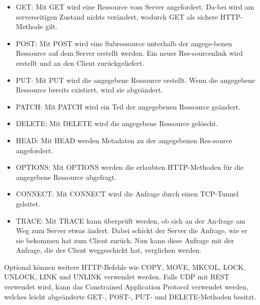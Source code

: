 \begin{itemize}
    \item GET: Mit GET wird eine Ressource vom Server angefordert. Da-bei wird am serverseitigen Zustand nichts verändert, wodurch GET als sichere HTTP-Methode gilt.
    \item POST: Mit POST wird eine Subressource unterhalb der angege-benen Ressource auf dem Server erstellt werden. Ein neuer Res-sourcenlink wird erstellt und an den Client zurückgeliefert.
    \item PUT: Mit PUT wird die angegebene Ressource erstellt. Wenn die angegebene Ressource bereits existiert, wird sie abgeändert. 
    \item PATCH: Mit PATCH wird ein Teil der angegebenen Ressource geändert. 
    \item DELETE: Mit DELETE wird die angegebene Ressource gelöscht.
    \item HEAD: Mit HEAD werden Metadaten zu der angegebenen Res-source angefordert. 
    \item OPTIONS: Mit OPTIONS werden die erlaubten HTTP-Methoden für die angegebene Ressource abgefragt. 
    \item CONNECT: Mit CONNECT wird die Anfrage durch einen TCP-Tunnel geleitet. 
    \item TRACE: Mit TRACE kann überprüft werden, ob sich an der An-frage am Weg zum Server etwas ändert. Dabei schickt der Server die Anfrage, wie er sie bekommen hat zum Client zurück. Nun kann diese Anfrage mit der Anfrage, die der Client weggeschickt hat, verglichen werden. 
\end{itemize}

Optional können weitere HTTP-Befehle wie COPY, MOVE, MKCOL, LOCK, UNLOCK, LINK und UNLINK verwendet werden. Falls UDP mit REST verwendet wird, kann das Constrained Application Protocol verwendet werden, welches leicht abgeänderte GET-, POST-, PUT- und DELETE-Methoden besitzt. \cite{WikiREST}
